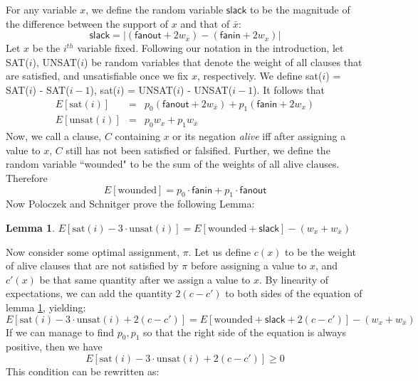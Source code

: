 \documentclass[11pt,letter]{article}
\newtheorem{lemma}{Lemma}
\begin{document}
For any variable $x$, we define the random variable $\mathsf{slack}$ to be the magnitude of the difference between the support of $x$ and that of $\bar{x}$:
\begin{equation}
\mathsf{slack} = |(\mathsf{fanout} + 2w_{\bar{x}}) -(\mathsf{fanin} + 2w_x)|
\end{equation}
Let $x$ be the $i^{th}$ variable fixed. Following our notation in the introduction, let SAT($i$), UNSAT($i$) be random variables that denote the weight of all clauses that are satisfied, and unsatisfiable once we fix $x$, respectively. We define sat($i$) = SAT($i$) - SAT($i-1$), sat($i$) = UNSAT($i$) - UNSAT($i-1$). It follows that
\begin{eqnarray}
E[\mathrm{sat}(i)] &=& p_0(\mathsf{fanout} + 2w_{\bar{x}}) + p_1(\mathsf{fanin} + 2w_{x})\\
E[\mathrm{unsat}(i)] &=& p_0w_x + p_1w_{\bar{x}}
\end{eqnarray}
Now, we call a clause, $C$ containing $x$ or its negation \textit{alive} iff after assigning a value to $x$, $C$ still has not been satisfied or falsified. Further, we define the random variable ``wounded" to be the sum of the weights of all alive clauses. Therefore
\begin{equation}
E[\mathrm{wounded}] = p_0 \cdot \mathsf{fanin} + p_1 \cdot \mathsf{fanout}
\end{equation}
Now Poloczek and Schnitger prove the following Lemma:
\begin{lemma} \label{L:2}
$E[\mathrm{sat}(i) - 3\cdot\mathrm{unsat}(i)] = E[\mathrm{wounded} + \mathsf{slack}] - (w_x + w_{\bar{x}})$
\end{lemma}
Now consider some optimal assignment, $\pi$. Let us define $c(x)$ to be the weight of alive clauses that are not satisfied by $\pi$ before assigning a value to $x$, and $c'(x)$ be that same quantity after we assign a value to $x$. By linearity of expectations, we can add the quantity $2(c-c')$ to both sides of the equation of lemma \ref{L:2}, yielding:
\begin{equation}
E[\mathrm{sat}(i) - 3\cdot\mathrm{unsat}(i)+ 2(c-c')] = E[\mathrm{wounded} + \mathsf{slack} + 2(c-c')] - (w_x + w_{\bar{x}})
\end{equation}
If we can manage to find $p_0,p_1$ so that the right side of the equation is always positive, then we have
\begin{equation}
E[\mathrm{sat}(i) - 3\cdot\mathrm{unsat}(i)+ 2(c-c')] \ge 0 \label{C:1}
\end{equation}
This condition can be rewritten as:
\end{document}
